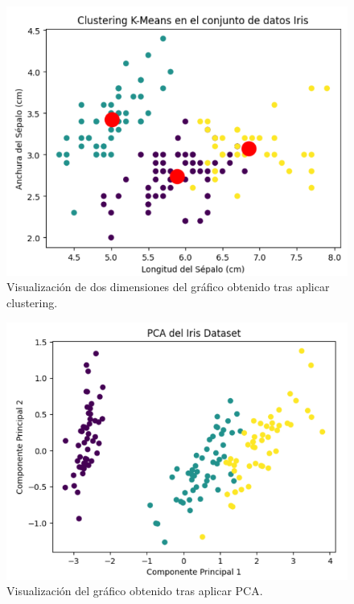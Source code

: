 \begin{figure}
    \centering
    \includegraphics[width=1\linewidth]{img/clustering.png}
    \caption{Visualización de dos dimensiones del gráfico obtenido tras aplicar clustering.}
    \label{fig:machine2}
\end{figure}


\begin{figure}
    \centering
    \includegraphics[width=1\linewidth]{img/pca.png}
    \caption{Visualización del gráfico obtenido tras aplicar PCA.}
    \label{fig:machine3}
\end{figure}
